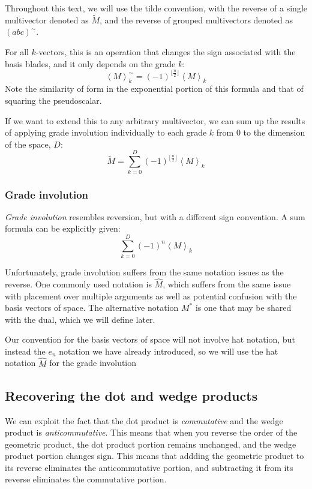 Throughout this text, we will use the tilde convention, with the reverse of a single multivector
denoted as $\tilde{M}$, and the reverse of grouped multivectors denoted as $\left(abc\right)^\sim$.

For all $k$-vectors, this is an operation that changes the sign associated with the basis blades,
and it only depends on the grade $k$:
$$
\left<M\right>_k^\sim = \left(-1\right)^{\lfloor \frac{n}{2} \rfloor} \left<M\right>_k
$$
Note the similarity of form in the exponential portion of this formula and that of squaring the
pseudoscalar. 

If we want to extend this to any arbitrary multivector, we can sum up the results of applying grade
involution individually to each grade $k$ from 0 to the dimension of the space, $D$:
$$
\tilde{M} = \sum_{k = 0}^{D} \left(-1\right)^{\lfloor \frac{n}{2} \rfloor} \left<M\right>_k
$$

\subsubsection{Grade involution}

\textit{Grade involution} resembles reversion, but with a different sign convention. A sum formula
can be explicitly given:
$$
 \sum_{k = 0}^{D} \left(-1\right)^{n} \left<M\right>_k
$$

Unfortunately, grade involution suffers from the same notation issues as the reverse. One commonly
used notation is $\hat{M}$, which suffers from the same issue with placement over multiple arguments
as well as potential confusion with the basis vectors of space. The alternative notation $M^*$ is
one that may be shared with the dual, which we will define later.

Our convention for the basis vectors of space will not involve hat notation, but instead the $e_n$
notation we have already introduced, so we will use the hat notation $\hat{M}$ for the grade
involution

\subsection{Recovering the dot and wedge products}

We can exploit the fact that the dot product is \textit{commutative} and the wedge product is
\textit{anticommutative}. This means that when you reverse the order of the geometric product, the
dot product portion remains unchanged, and the wedge product portion changes sign. This means that
addding the geometric product to its reverse eliminates the anticommutative portion, and 
subtracting it from its reverse eliminates the commutative portion.

